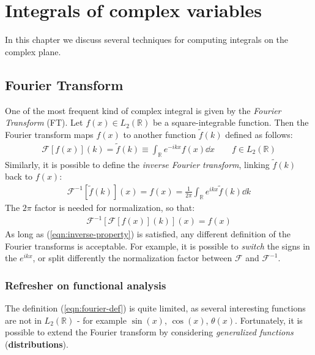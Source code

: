 \documentclass[../template.tex]{subfiles}
\begin{document}
\chapter{Integrals of complex variables}
In this chapter we discuss several techniques for computing integrals on the complex plane.

\section{Fourier Transform}
One of the most frequent kind of complex integral is given by the \textit{Fourier Transform} (FT). Let $f(x) \in L_2(\mathbb{R})$ be a square-integrable function. Then the Fourier transform maps $f(x)$ to another function $\tilde{f}(k)$ defined as follows: 
\begin{align} \label{eqn:fourier-def}
    \mathcal{F}[f(x)](k) = \tilde{f}(k) \equiv \int_{\mathbb{R}} e^{-ikx} f(x) \dd{x} \qquad f \in L_2(\mathbb{R})
\end{align}
Similarly, it is possible to define the \textit{inverse Fourier transform}, linking $\tilde{f}(k)$ back to $f(x)$: 
\begin{align*}
    \mathcal{F}^{-1}[\tilde{f}(k)](x) = f(x) = \frac{1}{2\pi} \int_{\mathbb{R}} e^{ikx} \tilde{f}(k) \dd{k} 
\end{align*} 
The $2 \pi$ factor is needed for normalization, so that:
\begin{align}
    \mathcal{F}^{-1}[\mathcal{F}[f(x)](k)](x) = f(x) \label{eqn:inverse-property}
\end{align}
As long as (\ref{eqn:inverse-property}) is satisfied, any different  definition of the Fourier transforms is acceptable. For example, it is possible to \textit{switch} the signs in the $e^{ikx}$, or split differently the normalization factor between $\mathcal{F}$ and $\mathcal{F}^{-1}$. 

\subsection{Refresher on functional analysis}
The definition (\ref{eqn:fourier-def}) is quite limited, as several interesting functions are not in $L_2(\mathbb{R})$ - for example $\sin(x)$, $\cos(x)$, $\theta(x)$. Fortunately, it is possible to extend the Fourier transform by considering \textit{generalized functions} (\textbf{distributions}).   

\medskip
\end{document}
